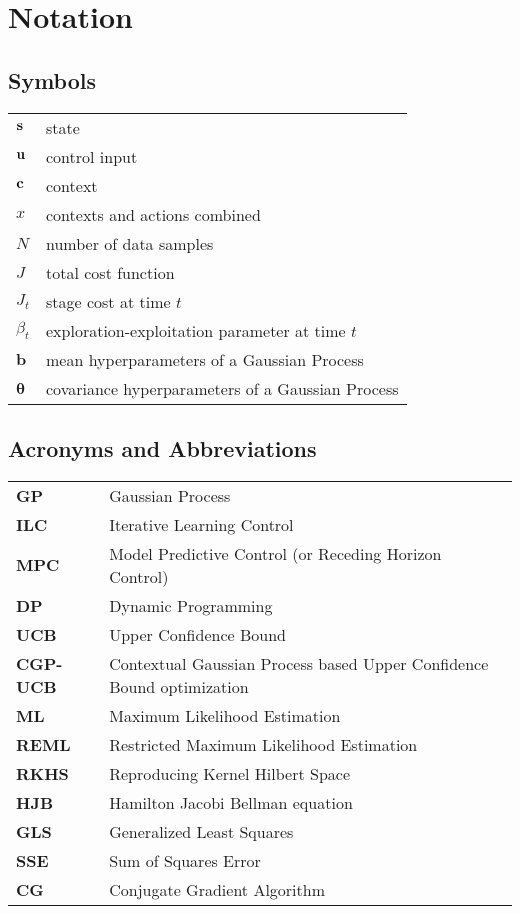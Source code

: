 \chapter*{Notation}

\section*{Symbols}

\begin{tabular}{ll}
$\mathbf{s}$ & state \\
$\mathbf{u}$ & control input \\
$\mathbf{c}$ & context \\
$x$ & contexts and actions combined \\
$N$ & number of data samples \\
$J$ & total cost function \\
$J_{t}$ & stage cost at time $t$ \\
$\beta_{t}$ & exploration-exploitation parameter at time $t$ \\
$\mathbf{b}$ & mean hyperparameters of a Gaussian Process \\
$\boldsymbol{\theta}$ & covariance hyperparameters of a Gaussian Process \\
\end{tabular}

\section*{Acronyms and Abbreviations}

\begin{tabular}{ll}
\textbf{GP}      & Gaussian Process \\
\textbf{ILC}     & Iterative Learning Control \\
\textbf{MPC}     & Model Predictive Control (or Receding Horizon Control) \\
\textbf{DP}      & Dynamic Programming \\
\textbf{UCB}     & Upper Confidence Bound \\
\textbf{CGP-UCB} & Contextual Gaussian Process based Upper Confidence Bound optimization \\
\textbf{ML}      & Maximum Likelihood Estimation \\
\textbf{REML}    & Restricted Maximum Likelihood Estimation \\
\textbf{RKHS} 	 & Reproducing Kernel Hilbert Space \\
\textbf{HJB}     & Hamilton Jacobi Bellman equation \\
\textbf{GLS} 	 & Generalized Least Squares \\
\textbf{SSE} 	 & Sum of Squares Error \\
\textbf{CG}      & Conjugate Gradient Algorithm 
\end{tabular}